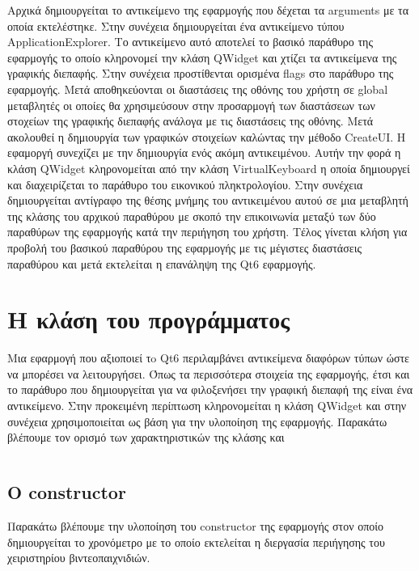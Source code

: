 Αρχικά δημιουργείται το αντικείμενο της εφαρμογής που δέχεται τα arguments με τα οποία εκτελέστηκε.
Στην συνέχεια δημιουργείται ένα αντικείμενο τύπου ApplicationExplorer. Το αντικείμενο αυτό αποτελεί
το βασικό παράθυρο της εφαρμογής το οποίο κληρονομεί την κλάση QWidget και χτίζει τα αντικείμενα της
γραφικής διεπαφής. Στην συνέχεια προστίθενται ορισμένα flags στο παράθυρο της εφαρμογής. Μετά αποθηκεύονται
οι διαστάσεις της οθόνης του χρήστη σε global μεταβλητές οι οποίες θα χρησιμεύσουν στην προσαρμογή των
διαστάσεων των στοχείων της γραφικής διεπαφής ανάλογα με τις διαστάσεις της οθόνης. Μετά ακολουθεί η
δημιουργία των γραφικών στοιχείων καλώντας την μέθοδο CreateUI. Η εφαμοργή συνεχίζει με την δημιουργία
ενός ακόμη αντικειμένου. Αυτήν την φορά η κλάση QWidget κληρονομείται από την κλάση VirtualKeyboard
η οποία δημιουργεί και διαχειρίζεται το παράθυρο του εικονικού πληκτρολογίου. Στην συνέχεια δημιουργείται
αντίγραφο της θέσης μνήμης του αντικειμένου αυτού σε μια μεταβλητή της κλάσης του αρχικού παραθύρου με
σκοπό την επικοινωνία μεταξύ των δύο παραθύρων της εφαρμογής κατά την περιήγηση του χρήστη. Τέλος γίνεται
κλήση για προβολή του βασικού παραθύρου της εφαρμογής με τις μέγιστες διαστάσεις παραθύρου και μετά
εκτελείται η επανάληψη της Qt6 εφαρμογής. 


\section{Η κλάση του προγράμματος}


Μια εφαρμογή που αξιοποιεί τo Qt6 περιλαμβάνει αντικείμενα διαφόρων τύπων ώστε να
μπορέσει να λειτουργήσει. Όπως τα περισσότερα στοιχεία της εφαρμογής, έτσι και το
παράθυρο που δημιουργείται για να φιλοξενήσει την γραφική διεπαφή της είναι ένα αντικείμενο. 
Στην προκειμένη περίπτωση κληρονομείται η κλάση QWidget και στην συνέχεια χρησιμοποιείται 
ως βάση για την υλοποίηση της εφαρμογής. Παρακάτω βλέπουμε τον ορισμό των χαρακτηριστικών
της κλάσης και 


\begin{lstlisting}[language=C++, style=cppstyle]

\end{lstlisting}





\subsection{Ο constructor}
Παρακάτω βλέπουμε την υλοποίηση του constructor της εφαρμογής στον οποίο δημιουργείται 
το χρονόμετρο με το οποίο εκτελείται η διεργασία περιήγησης του χειριστηρίου βιντεοπαιχνιδιών.

